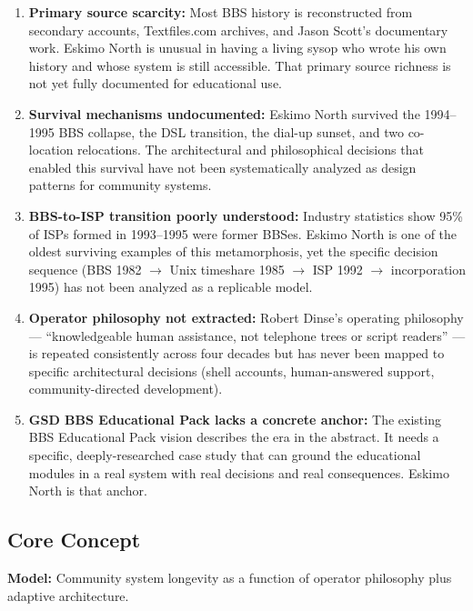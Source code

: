 \documentclass[11pt,letterpaper]{article}
\begin{document}
\begin{enumerate}
  \item \textbf{Primary source scarcity:} Most BBS history is reconstructed from secondary accounts, Textfiles.com archives, and Jason Scott's documentary work. Eskimo North is unusual in having a living sysop who wrote his own history and whose system is still accessible. That primary source richness is not yet fully documented for educational use.

  \item \textbf{Survival mechanisms undocumented:} Eskimo North survived the 1994--1995 BBS collapse, the DSL transition, the dial-up sunset, and two co-location relocations. The architectural and philosophical decisions that enabled this survival have not been systematically analyzed as design patterns for community systems.

  \item \textbf{BBS-to-ISP transition poorly understood:} Industry statistics show 95\% of ISPs formed in 1993--1995 were former BBSes. Eskimo North is one of the oldest surviving examples of this metamorphosis, yet the specific decision sequence (BBS 1982 $\rightarrow$ Unix timeshare 1985 $\rightarrow$ ISP 1992 $\rightarrow$ incorporation 1995) has not been analyzed as a replicable model.

  \item \textbf{Operator philosophy not extracted:} Robert Dinse's operating philosophy --- ``knowledgeable human assistance, not telephone trees or script readers'' --- is repeated consistently across four decades but has never been mapped to specific architectural decisions (shell accounts, human-answered support, community-directed development).

  \item \textbf{GSD BBS Educational Pack lacks a concrete anchor:} The existing BBS Educational Pack vision describes the era in the abstract. It needs a specific, deeply-researched case study that can ground the educational modules in a real system with real decisions and real consequences. Eskimo North is that anchor.
\end{enumerate}

\subsection{Core Concept}

\textbf{Model:} Community system longevity as a function of operator philosophy plus adaptive architecture.
\end{document}
